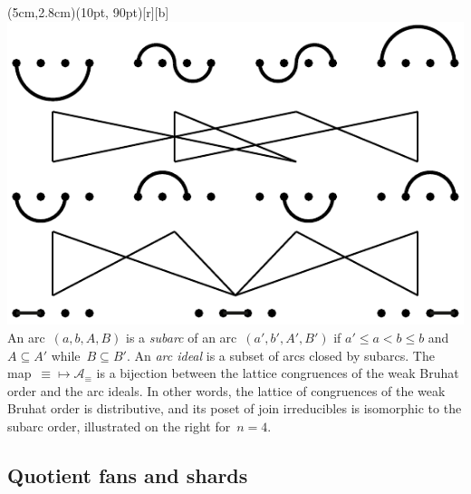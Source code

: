 \documentclass{amsart}
\theoremstyle{definition}
\renewcommand{\c}[1]{\mathcal{#1}} %
\newcommand{\darkblue}{\color{darkblue}} %
\newcommand{\defn}[1]{\textsl{\darkblue #1}} %
\begin{document}
\vspace{-.1cm}
\parpic(5cm,2.8cm)(10pt, 90pt)[r][b]{\includegraphics[scale=.5]{subarcOrder}}{
An arc~$(a, b, A, B)$ is a \defn{subarc} of an arc~$(a', b', A', B')$ if \linebreak $a' \le a < b \le b$ and~$A \subseteq A'$ while~$B \subseteq B'$.
An \defn{arc ideal} is a subset of arcs closed by subarcs.
The map~${\equiv} \mapsto \c{A}_\equiv$ is a bijection between the lattice congruences of the weak Bruhat order and the arc ideals.
In other words, the lattice of congruences of the weak Bruhat order is distributive, and its poset of join irreducibles is isomorphic to the subarc order, illustrated on the right for~$n = 4$.
}


\subsection{Quotient fans and shards}
\label{subsec:quotientFans}
\end{document}
